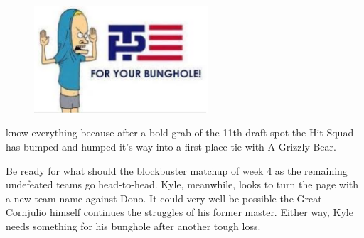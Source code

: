 \documentclass[11pt,letterpaper]{article}
\begin{document}
\begin{figure}
\centering
\includegraphics[width=0.575\textwidth]{week3-bunghole.png}
\label{fig:week3-bunghole}
\end{figure} 
\par\noindent  know everything because after a bold grab of the 11th draft spot the Hit Squad has bumped and humped it's way into a first place tie with A Grizzly Bear. 
\\\par\noindent Be ready for what should the blockbuster matchup of week 4 as the remaining undefeated teams go head-to-head. Kyle, meanwhile, looks to turn the page with a new team name against Dono. It could very well be possible the Great Cornjulio himself continues the struggles of his former master. Either way, Kyle needs something for his bunghole after another tough loss. 
\end{document}
